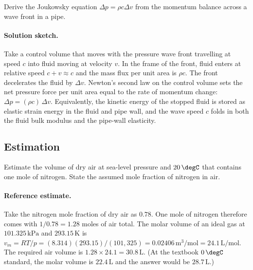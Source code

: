 \begin{exercise}
Derive the Joukowsky equation $\Delta p = \rho c \Delta v$ from the
momentum balance across a wave front in a pipe.

\paragraph{Solution sketch.} Take a control volume that moves with the
pressure wave front travelling at speed $c$ into fluid moving at velocity
$v$. In the frame of the front, fluid enters at relative speed $c + v
\approx c$ and the mass flux per unit area is $\rho c$. The front
decelerates the fluid by $\Delta v$. Newton's second law on the control
volume sets the net pressure force per unit area equal to the rate of
momentum change: $\Delta p = (\rho c)\,\Delta v$. Equivalently, the
kinetic energy of the stopped fluid is stored as elastic strain energy in
the fluid and pipe wall, and the wave speed $c$ folds in both the fluid
bulk modulus and the pipe-wall elasticity.
\end{exercise}

\subsection*{Estimation}

\begin{exercise}
Estimate the volume of dry air at sea-level pressure and $20\,\degC$
that contains one mole of nitrogen. State the assumed mole fraction
of nitrogen in air.

\paragraph{Reference estimate.} Take the nitrogen mole fraction of dry
air as $0.78$. One mole of nitrogen therefore comes with $1/0.78 = 1.28$
moles of air total. The molar volume of an ideal gas at
$101.325\,\text{kPa}$ and $293.15\,\si{\kelvin}$ is $v_m = RT/p =
(8.314)(293.15)/(101{,}325) = 0.02406\,\text{m}^3/\text{mol} = 24.1\,
\text{L}/\text{mol}$. The required air volume is $1.28\times 24.1 = 30.8\,
\text{L}$. (At the textbook $0\,\degC$ standard, the molar volume is
$22.4\,\text{L}$ and the answer would be $28.7\,\text{L}$.)
\end{exercise}

